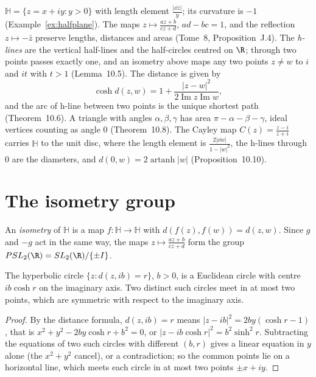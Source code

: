 \begin{reminder}
$\mathbb H=\{z=x+iy:y>0\}$ with length element $\frac{|\dd z|}y$; its curvature is $-1$ (Example~\ref{ex:halfplane}). The maps $z\mapsto\frac{az+b}{cz+d}$, $ad-bc=1$, and the reflection $z\mapsto-\bar z$ preserve lengths, distances and areas (Tome~8,
Proposition~J.4). The \emph{h-lines} are the vertical half-lines and the half-circles centred on $\R$; through two points passes exactly one, and an isometry above maps any
two points $z\ne w$ to $i$ and $it$ with $t>1$ (Lemma~10.5). The distance is given by
\[\cosh d(z,w)=1+\frac{|z-w|^2}{2\operatorname{Im}z\operatorname{Im}w},\]
and the arc of h-line between two points is the unique shortest path (Theorem~10.6). A triangle with angles $\alpha,\beta,\gamma$ has area $\pi-\alpha-\beta-\gamma$, ideal vertices counting as
angle $0$ (Theorem~10.8). The Cayley map $C(z)=\frac{z-i}{z+i}$ carries $\mathbb H$ to the unit disc, where the length element is $\frac{2|\dd w|}{1-|w|^2}$, the h-lines through $0$ are the diameters, and
$d(0,w)=2\operatorname{artanh}|w|$ (Proposition~10.10).
\end{reminder}

\section{The isometry group}

An \emph{isometry} of $\mathbb H$ is a map $f\colon\mathbb H\to\mathbb H$ with $d(f(z),f(w))=d(z,w)$. Since $g$ and $-g$ act in the same way, the maps $z\mapsto\frac{az+b}{cz+d}$ form the group
$PSL_2(\R)=SL_2(\R)/\{\pm I\}$.

\begin{lemma}\label{lem:hypcircles}
The hyperbolic circle $\{z:d(z,ib)=r\}$, $b>0$, is a Euclidean circle with centre $ib\cosh r$ on the imaginary axis. Two distinct such circles meet in at most two points,
which are symmetric with respect to the imaginary axis.
\end{lemma}

\begin{proof}
By the distance formula, $d(z,ib)=r$ means $|z-ib|^2=2by(\cosh r-1)$, that is $x^2+y^2-2by\cosh r+b^2=0$, or $|z-ib\cosh r|^2=b^2\sinh^2r$. Subtracting the equations of two such
circles with different $(b,r)$ gives a linear equation in $y$ alone (the $x^2+y^2$ cancel), or a contradiction; so the common points lie on a horizontal line, which meets each
circle in at most two points $\pm x+iy$.
\end{proof}

